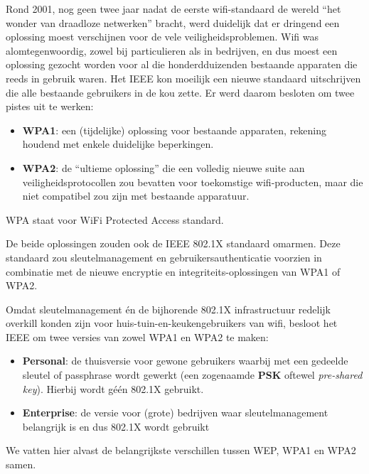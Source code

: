 \documentclass[
  10pt,
  dutch,
  paper=a4,
  ,captions=tableheading
]{scrbook}
\providecommand{\tightlist}{%
  \setlength{\itemsep}{0pt}\setlength{\parskip}{0pt}}
\begin{document}
Rond 2001, nog geen twee jaar nadat de eerste wifi-standaard de wereld
``het wonder van draadloze netwerken'' bracht, werd duidelijk dat er
dringend een oplossing moest verschijnen voor de vele
veiligheidsproblemen. Wifi was alomtegenwoordig, zowel bij particulieren
als in bedrijven, en dus moest een oplossing gezocht worden voor al die
honderdduizenden bestaande apparaten die reeds in gebruik waren. Het
IEEE kon moeilijk een nieuwe standaard uitschrijven die alle bestaande
gebruikers in de kou zette. Er werd daarom besloten om twee pistes uit
te werken:

\begin{itemize}
\tightlist
\item
  \textbf{WPA1}: een (tijdelijke) oplossing voor bestaande apparaten,
  rekening houdend met enkele duidelijke beperkingen.
\item
  \textbf{WPA2}: de ``ultieme oplossing'' die een volledig nieuwe suite
  aan veiligheidsprotocollen zou bevatten voor toekomstige
  wifi-producten, maar die niet compatibel zou zijn met bestaande
  apparatuur.
\end{itemize}

\begin{tipblock}
WPA staat voor WiFi Protected Access standard.
\end{tipblock}

De beide oplossingen zouden ook de IEEE 802.1X standaard omarmen. Deze
standaard zou sleutelmanagement en gebruikersauthenticatie voorzien in
combinatie met de nieuwe encryptie en integriteits-oplossingen van WPA1
of WPA2.

Omdat sleutelmanagement én de bijhorende 802.1X infrastructuur redelijk
overkill konden zijn voor huis-tuin-en-keukengebruikers van wifi,
besloot het IEEE om twee versies van zowel WPA1 en WPA2 te maken:

\begin{itemize}
\tightlist
\item
  \textbf{Personal}: de thuisversie voor gewone gebruikers waarbij met
  een gedeelde sleutel of passphrase wordt gewerkt (een zogenaamde
  \textbf{PSK} oftewel \emph{pre-shared key}). Hierbij wordt géén 802.1X
  gebruikt.
\item
  \textbf{Enterprise}: de versie voor (grote) bedrijven waar
  sleutelmanagement belangrijk is en dus 802.1X wordt gebruikt
\end{itemize}

We vatten hier alvast de belangrijkste verschillen tussen WEP, WPA1 en
WPA2 samen.
\end{document}
